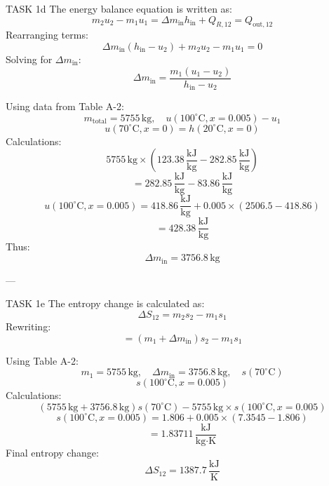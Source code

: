 TASK 1d  
The energy balance equation is written as:  
\[
m_2 u_2 - m_1 u_1 = \Delta m_{\text{in}} h_{\text{in}} + Q_{R,12} = Q_{\text{out},12}
\]  
Rearranging terms:  
\[
\Delta m_{\text{in}} (h_{\text{in}} - u_2) + m_2 u_2 - m_1 u_1 = 0
\]  
Solving for \( \Delta m_{\text{in}} \):  
\[
\Delta m_{\text{in}} = \frac{m_1 (u_1 - u_2)}{h_{\text{in}} - u_2}
\]  

Using data from Table A-2:  
\[
m_{\text{total}} = 5755 \, \text{kg}, \quad u(100^\circ\text{C}, x=0.005) - u_1
\]  
\[
u(70^\circ\text{C}, x=0) = h(20^\circ\text{C}, x=0)
\]  
Calculations:  
\[
5755 \, \text{kg} \times (123.38 \, \frac{\text{kJ}}{\text{kg}} - 282.85 \, \frac{\text{kJ}}{\text{kg}})
\]  
\[
= 282.85 \, \frac{\text{kJ}}{\text{kg}} - 83.86 \, \frac{\text{kJ}}{\text{kg}}
\]  
\[
u(100^\circ\text{C}, x=0.005) = 418.86 \, \frac{\text{kJ}}{\text{kg}} + 0.005 \times (2506.5 - 418.86)
\]  
\[
= 428.38 \, \frac{\text{kJ}}{\text{kg}}
\]  
Thus:  
\[
\Delta m_{\text{in}} = 3756.8 \, \text{kg}
\]  

---

TASK 1e  
The entropy change is calculated as:  
\[
\Delta S_{12} = m_2 s_2 - m_1 s_1
\]  
Rewriting:  
\[
= (m_1 + \Delta m_{\text{in}}) s_2 - m_1 s_1
\]  

Using Table A-2:  
\[
m_1 = 5755 \, \text{kg}, \quad \Delta m_{\text{in}} = 3756.8 \, \text{kg}, \quad s(70^\circ\text{C})
\]  
\[
s(100^\circ\text{C}, x=0.005)
\]  
Calculations:  
\[
(5755 \, \text{kg} + 3756.8 \, \text{kg}) s(70^\circ\text{C}) - 5755 \, \text{kg} \times s(100^\circ\text{C}, x=0.005)
\]  
\[
s(100^\circ\text{C}, x=0.005) = 1.806 + 0.005 \times (7.3545 - 1.806)
\]  
\[
= 1.83711 \, \frac{\text{kJ}}{\text{kg·K}}
\]  
Final entropy change:  
\[
\Delta S_{12} = 1387.7 \, \frac{\text{kJ}}{\text{K}}
\]